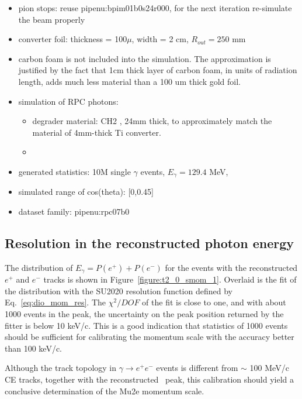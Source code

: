 \begin{itemize}
\item
  pion stops: reuse pipenu:bpim01b0s24r000, {\red for the next iteration re-simulate the beam properly}
\item
  converter foil:  thickness = 100$\mu$, width = 2 cm, $R_{out} = 250$ mm
\item
  carbon foam is not included into the simulation. The approximation is justified
  by the fact that 1cm thick layer of carbon foam, in units of radiation length,
  adds much less material than a 100 um thick gold foil.
\item 
  simulation of RPC photons:
  \begin{itemize}
  \item 
    degrader material: CH2 , 24mm thick,
    to approximately match the material of 4mm-thick Ti converter.
  \item 
  \end{itemize}
\item
  generated statistics: 10M single $\gamma$ events, $E_\gamma = 129.4$ MeV, 
\item
  simulated range of cos(theta): [0,0.45] 
\item
  dataset family: pipenu:rpc07b0
\end{itemize}

\newpage
\subsection{Resolution in the reconstructed photon energy}

The distribution of $E_\gamma = P(e^+) + P(e^-)$ for the events
with the reconstructed $e^+$ and $e^-$ tracks is shown in Figure~\ref{figure:t2_0_smom_1}.
Overlaid is the fit of the distribution with the SU2020 resolution function
defined by Eq.~\ref{eq:dio_mom_res}.
The $\chi^2/DOF$ of the fit is close to one, and with about 1000 events in the peak,
the uncertainty on the peak position returned by the fitter is below 10 keV/c.
This is a good indication that statistics of 1000 events should be sufficient
for calibrating the momentum scale with the accuracy better than 100 keV/c.

Although the track topology in $\gamma \to e^+e^-$ events is different from
$\sim$ 100 MeV/c CE tracks, together with the reconstructed \piplusenu\ peak,
this calibration should yield a conclusive determination of the Mu2e momentum scale.

